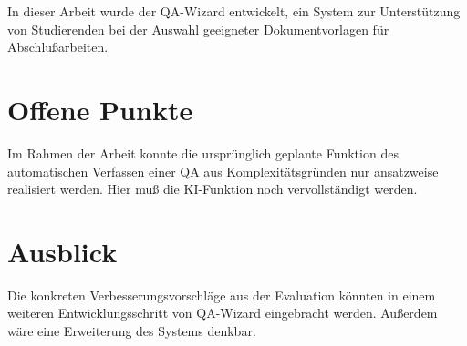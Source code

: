 \documentclass[12pt,        %
  english,ngerman,          %
  paper=a4,                 %
  captions=tablesignature,  %
  listof=numbered,          %
  bibliography=totoc,       %
  headings=small,           %
  headinclude=false,        %
  footinclude=false,        %
  parskip=half-,            %
  oneside,                  %
  BCOR=5mm,                 %
  DIV=12                    %
  ]{scrbook}                %
\begin{document}

In dieser Arbeit wurde der QA-Wizard entwickelt, ein System zur Unterstützung von Studierenden bei
der Auswahl geeigneter Dokumentvorlagen für Abschlußarbeiten.

\section{Offene Punkte}\label{sec:conc_open_questions}


Im Rahmen der Arbeit konnte die ursprünglich geplante Funktion des automatischen Verfassen einer QA aus Komplexitätsgründen nur ansatzweise realisiert werden. Hier muß die KI-Funktion noch vervollständigt werden.

\section{Ausblick}\label{sec:conc_outlook}


Die konkreten Verbesserungsvorschläge aus der Evaluation könnten in einem weiteren  Entwicklungsschritt von QA-Wizard eingebracht werden. Außerdem wäre eine Erweiterung des Systems denkbar.



\backmatter

  \cleardoublepage
  \listoffigures

  \cleardoublepage
  \listoftables

  \cleardoublepage
  \lstlistoflistings  %
\end{document}
